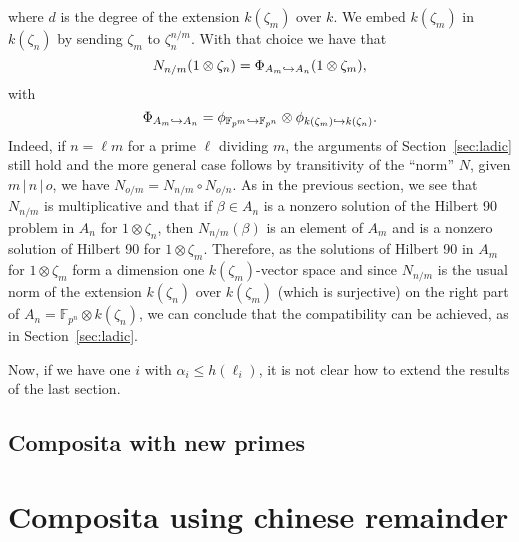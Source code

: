 \documentclass[a4paper,11pt]{article}
\begin{document}
where $d$ is the degree of the extension $k(\zeta_m)$ over $k$. We embed
$k(\zeta_m)$ in $k(\zeta_n)$ by sending $\zeta_m$ to $\zeta_n^{n/m}$. With that
choice we have that
\[
  N_{n/m}(1\otimes\zeta_n) = \Phi_{A_m\hookrightarrow A_n}(1\otimes\zeta_m),
\]
with 
\[
  \Phi_{A_m\hookrightarrow
  A_n}=\phi_{\mathbb{F}_{p^m}\hookrightarrow\mathbb{F}_{p^n}}\otimes\phi_{k(\zeta_m)\hookrightarrow
  k(\zeta_n)}.
\]
Indeed, if $n = \ell m$ for a prime $\ell$ dividing $m$, the arguments of
Section~\ref{sec:ladic} still hold and the more general case follows by
transitivity of the ``norm'' $N$, \ie given $m\,|\,n\,|\,o$, we have
$N_{o/m}=N_{n/m}\circ N_{o/n}$. As in the previous section, we see that
$N_{n/m}$ is multiplicative and that if $\beta\in A_n$ is a nonzero solution of
the Hilbert 90 problem in $A_n$ for $1\otimes\zeta_n$, then $N_{n/m}(\beta)$ is
an element of $A_m$ and is a nonzero solution of Hilbert 90 for
$1\otimes\zeta_m$. Therefore, as the solutions of Hilbert 90 in $A_m$ for
$1\otimes\zeta_m$ form a dimension one $k(\zeta_m)$-vector space and since
$N_{n/m}$ is the usual norm of the extension $k(\zeta_n)$ over $k(\zeta_m)$
(which is surjective) on the right part of $A_n=\mathbb{F}_{p^n}\otimes
k(\zeta_n)$, we can conclude that the compatibility can be achieved, as in
Section~\ref{sec:ladic}.

Now, if we have one $i$ with $\alpha_i\leq h(\ell_i)$, it is not clear how to
extend the results of the last section.

\subsection{Composita with new primes}
\label{sec:comp-norm-w}


\section{Composita using chinese remainder}
\label{sec:comp-crt}
\end{document}
